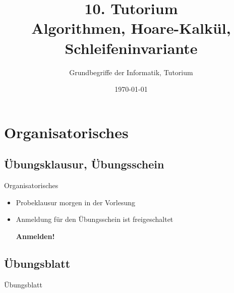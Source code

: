




\usepackage{tcolorbox}

\newcommand{\HTB}[1]{\ensuremath{\colorbox{lightgray!90}{\{ #1 \}}}}
\newcommand{\HT}[3]{\ensuremath{\HTB{#1} \; #2 \; \HTB{#3}}}


\title[Algorithmen]{10. Tutorium\\ Algorithmen, Hoare-Kalkül, Schleifeninvariante}
\subtitle{Grundbegriffe der Informatik, Tutorium \hashtag\mytutnumber}
\date{\today}


\titleframe
\roadmap

\section{Organisatorisches}
\subsection{Übungsklausur, Übungsschein}
\begin{frame}{Organisatorisches}
\begin{itemize}
	\item Probeklausur morgen in der Vorlesung
	\item Anmeldung für den Übungsschein ist freigeschaltet\\
			\centerline{\textbf{Anmelden!}}
\end{itemize}
\end{frame}

\subsection{Übungsblatt}
\begin{frame}{Übungsblatt}
    \Stephan{}
    \Alex{}
\end{frame}



